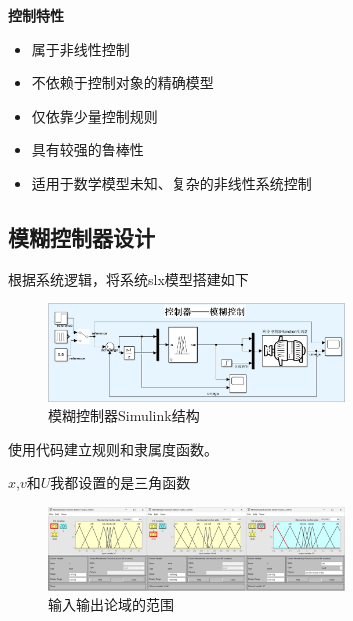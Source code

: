 \documentclass[12pt,a4paper,UTF8]{article}
\begin{document}
\textbf{控制特性}
\begin{itemize}
    \item 属于非线性控制
    \item 不依赖于控制对象的精确模型
    \item 仅依靠少量控制规则
    \item 具有较强的鲁棒性
    \item 适用于数学模型未知、复杂的非线性系统控制
\end{itemize}


\subsection{模糊控制器设计}

根据系统逻辑，将系统slx模型搭建如下

\begin{figure}[htbp] \centering \includegraphics[width=0.7\textwidth]{2025-01-10-17-36-52.png} \caption{模糊控制器Simulink结构}\end{figure}

使用代码建立规则和隶属度函数。

$x$,$v$和$U$我都设置的是三角函数

\begin{figure}[htbp] \centering \includegraphics[width=0.7\textwidth]{2025-01-10-16-16-42.png} \caption{输入输出论域的范围}\end{figure}
\end{document}
